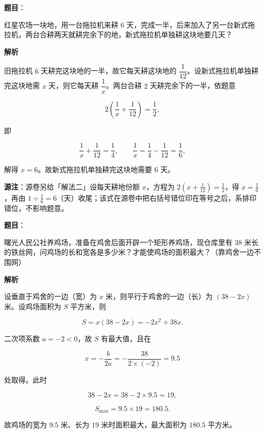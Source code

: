 \begin{answer}

\textbf{题目}：

红星农场一块地，用一台拖拉机来耕 $6$ 天，完成一半，后来加入了另一台新式拖拉机，两台合耕两天就耕完余下的地，新式拖拉机单独耕这块地要几天？

\textbf{解析}

旧拖拉机 $6$ 天耕完这块地的一半，故它每天耕这块地的 $\dfrac{1}{12}$。设新式拖拉机单独耕完这块地需 $x$ 天，则它每天耕 $\dfrac{1}{x}$。两台合耕 $2$ 天耕完余下的一半，依题意

\nopagebreak[4]
\[
2\left(\frac{1}{x}+\frac{1}{12}\right)=\frac{1}{2},
\]

即

\nopagebreak[4]
\[
\frac{1}{x}+\frac{1}{12}=\frac{1}{4},
\qquad
\frac{1}{x}=\frac{1}{4}-\frac{1}{12}=\frac{1}{6},
\]

解得 $x=6$。故新式拖拉机单独耕完这块地需要 $6$ 天。

\begin{gktip}
\textbf{源注}：源卷另给「解法二」设每天耕地份额 $x$，方程为 $2\left(x+\frac{1}{12}\right)=\frac{1}{2}$，得 $x=\frac{1}{6}$，再由 $1\div\frac{1}{6}=6$（天）收尾；该式在源卷中把右括号错位印在等号之后，系排印错位，不影响题意。
\end{gktip}


\end{answer}
\begin{answer}

\textbf{题目}：

曙光人民公社养鸡场，准备在鸡舍后面开辟一个矩形养鸡场，现仓库里有 $38$ 米长的铁丝网，问鸡场的长和宽各是多少米？才能使鸡场的面积最大？（靠鸡舍一边不围网）

\textbf{解析}

设垂直于鸡舍的一边（宽）为 $x$ 米，则平行于鸡舍的一边（长）为 $(38-2x)$ 米。设鸡场面积为 $S$ 平方米，则

\nopagebreak[4]
\[
S=x(38-2x)=-2x^2+38x.
\]

二次项系数 $a=-2<0$，故 $S$ 有最大值，且在

\nopagebreak[4]
\[
x=-\frac{b}{2a}=-\frac{38}{2\times(-2)}=9.5
\]

处取得。此时

\nopagebreak[4]
\[
38-2x=38-2\times9.5=19,
\]

\nopagebreak[4]
\[
S_{\max}=9.5\times19=180.5.
\]

故鸡场的宽为 $9.5$ 米、长为 $19$ 米时面积最大，最大面积为 $180.5$ 平方米。


\end{answer}
